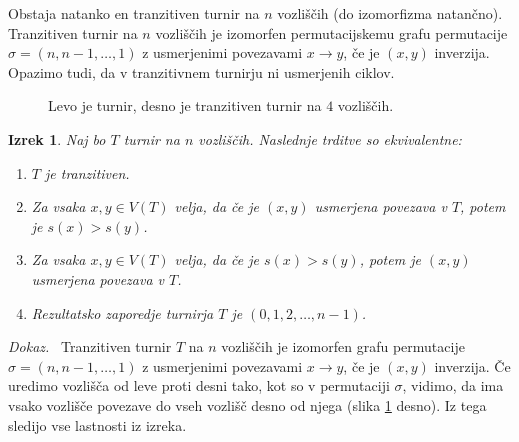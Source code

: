 \documentclass[a4paper, 12pt]{book}
\newtheorem{izrek}{Izrek}[chapter]
\newenvironment{dokaz}{\emph{Dokaz.}\ }{\hspace{\fill}{$\Box$}}
\begin{document}
Obstaja natanko en tranzitiven turnir na $n$ vozliščih (do izomorfizma natančno). Tranzitiven turnir na $n$ vozliščih je izomorfen permutacijskemu grafu permutacije $\sigma = (n, n-1, \dots, 1)$ z usmerjenimi povezavami $x \rightarrow y$, če je $(x, y)$ inverzija. Opazimo tudi, da v tranzitivnem turnirju ni usmerjenih ciklov. 

\begin{figure}[h]
    \begin{center}        
    \end{center}
    \caption{Levo je turnir, desno je tranzitiven turnir na $4$ vozliščih.}
    \label{graf_turnirja_in_tranzitivnega_turnirja}
\end{figure}

\begin{izrek}
\label{izrek_tranzitiven_turnir}
    Naj bo $T$ turnir na $n$ vozliščih. Naslednje trditve so ekvivalentne:
    \begin{enumerate}
        \item $T$ je tranzitiven.
        \item Za vsaka $x,y \in V(T)$ velja, da če je $(x, y)$ usmerjena povezava v $T$, potem je $s(x) > s(y)$.
        \item Za vsaka $x,y \in V(T)$  velja, da če je $s(x) > s(y)$, potem je $(x, y)$ usmerjena povezava v $T$.
        \item Rezultatsko zaporedje turnirja $T$ je $(0, 1, 2, \dots, n-1)$.
    \end{enumerate}
\end{izrek}
\begin{dokaz}
    Tranzitiven turnir $T$ na $n$ vozliščih je izomorfen grafu permutacije $\sigma = (n, n-1, \dots, 1)$ z usmerjenimi povezavami $x \rightarrow y$, če je $(x, y)$ inverzija. Če uredimo vozlišča od leve proti desni tako, kot so v permutaciji $\sigma$, vidimo, da ima vsako vozlišče povezave do vseh vozlišč desno od njega (slika \ref{graf_turnirja_in_tranzitivnega_turnirja} desno). Iz tega sledijo vse lastnosti iz izreka.
\end{dokaz}
\end{document}
